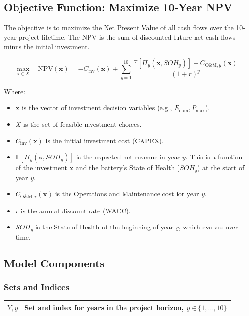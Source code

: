 \documentclass[11pt, a4paper]{article}
\begin{document}
\subsection{Objective Function: Maximize 10-Year NPV}
The objective is to maximize the Net Present Value of all cash flows over the 10-year project lifetime. The NPV is the sum of discounted future net cash flows minus the initial investment.

\begin{equation}
\max_{\mathbf{x} \in X} \quad \text{NPV}(\mathbf{x}) = -C_{\text{inv}}(\mathbf{x}) + \sum_{y=1}^{10} \frac{\mathbb{E}[\Pi_y(\mathbf{x}, SOH_y)] - C_{\text{O\&M},y}(\mathbf{x})}{(1 + r)^y}
\end{equation}

Where:
\begin{itemize}
    \item $\mathbf{x}$ is the vector of investment decision variables (e.g., $E_{\text{nom}}, P_{\text{max}}$).
    \item $X$ is the set of feasible investment choices.
    \item $C_{\text{inv}}(\mathbf{x})$ is the initial investment cost (CAPEX).
    \item $\mathbb{E}[\Pi_y(\mathbf{x}, SOH_y)]$ is the expected net revenue in year $y$. This is a function of the investment $\mathbf{x}$ and the battery's State of Health ($SOH_y$) at the start of year $y$.
    \item $C_{\text{O\&M},y}(\mathbf{x})$ is the Operations and Maintenance cost for year $y$.
    \item $r$ is the annual discount rate (WACC).
    \item $SOH_y$ is the State of Health at the beginning of year $y$, which evolves over time.
\end{itemize}

\subsection{Model Components}

\subsubsection{Sets and Indices}
\begin{tabular}{@{}ll}
\toprule
$Y, y$ & Set and index for years in the project horizon, $y \in \{1, ..., 10\}$ \\
\bottomrule
\end{tabular}
\end{document}
